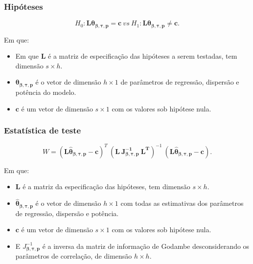 \documentclass[10pt,
  aspectratio=169,
  serif,
  mathserif,
  professionalfont,
  compress,
  handout,
  ]{beamer}\usepackage[]{graphicx}\usepackage[]{color}
\begin{document}

\begin{frame}
\frametitle{Hipóteses}

$$H_0: \boldsymbol{L}\boldsymbol{\theta_{\beta,\tau,p}} = \boldsymbol{c} \ vs \ H_1: \boldsymbol{L}\boldsymbol{\theta_{\beta,\tau,p}} \neq \boldsymbol{c}.$$ 

Em que: 

\begin{itemize}
  
  \item Em que $\boldsymbol{L}$ é a matriz de especificação das hipóteses a serem testadas, tem dimensão $s \times h$. 
  
  \item $\boldsymbol{\theta_{\beta,\tau,p}}$ é o vetor de dimensão $h \times 1$ de parâmetros de regressão, dispersão e potência do modelo. 
  
  \item $\boldsymbol{c}$ é um vetor de dimensão $s \times 1$ com os valores sob hipótese nula.

\end{itemize}

\end{frame}


\begin{frame}
\frametitle{Estatística de teste}

$$W = (\boldsymbol{L\hat\theta_{\beta,\tau,p}} - \boldsymbol{c})^T \ (\boldsymbol{L \ J_{\boldsymbol{{\beta,\tau,p}}}^{-1} \ L^T})^{-1} \ (\boldsymbol{L\hat\theta_{\beta,\tau,p}} - \boldsymbol{c}).$$

Em que: 

\begin{itemize}
  \item $\boldsymbol{L}$ é a matriz da especificação das hipóteses, tem dimensão $s \times h$. 

  \item $\boldsymbol{\hat\theta_{\beta,\tau,p}}$ é o vetor de dimensão $h \times 1$ com todas as estimativas dos parâmetros de regressão, dispersão e potência. 

  \item $\boldsymbol{c}$ é um vetor de dimensão $s \times 1$ com os valores sob hipótese nula. 

  \item E $J_{\boldsymbol{{\beta,\tau,p}}}^{-1}$ é a inversa da matriz de informação de Godambe desconsiderando os parâmetros de correlação, de dimensão $h \times h$. 

\end{itemize}

\end{frame}
\end{document}
